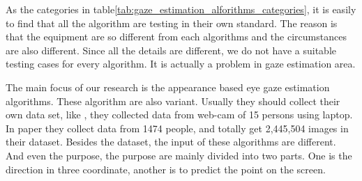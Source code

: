 \documentclass[senior]{IPSstyle}
\begin{document}
\begin{table}[h]
\centering
{}
\caption{Gaze estimation algorithms categories}
\label{tab:gaze_estimation_alforithms_categories}
\end{table}  
As the categories in  table\ref{tab:gaze_estimation_alforithms_categories}, it is easily to find that all the algorithm are testing in their own standard.
The reason is that the equipment are so different from each algorithms and the circumstances are also different.
Since all the details are different, we do not have a suitable testing cases for every algorithm.
It is actually a problem in gaze estimation area.

The main focus of our research is the appearance based eye gaze estimation algorithms\cite{zhang2015appearance}\cite{Sugano2014LearningbySynthesisFA}.
These algorithm are also variant.
Usually they should collect their own data set, like \cite{zhang2015appearance}, they collected data from web-cam of 15 persons using laptop.
In paper \cite{krafka2016eye} they collect data from 1474 people, and totally get 2,445,504 images in their dataset.
Besides the dataset, the input of these algorithms are different.
And even the purpose, the purpose are mainly divided into two parts.
One is the direction in three coordinate\cite{zhang2015appearance}, another is to predict the point on the screen\cite{krafka2016eye}.
\end{document}
